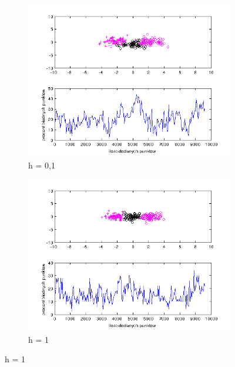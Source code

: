 \documentclass[10pt,a4paper]{article}
\begin{document}
\begin{figure}[H]
   \begin{subfigure}[b]{0.5\textwidth}
    \includegraphics[width=\textwidth]{test4_h0_1_20_63.png}
    \caption{h = 0,1}
  \end{subfigure}
  \hfill
  \begin{subfigure}[b]{0.5\textwidth}
    \includegraphics[width=\textwidth]{test4_h1_15_66.png}
    \caption{h = 1}
  \end{subfigure}
  

\end{figure}
\end{document}
